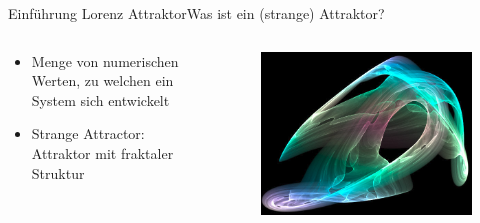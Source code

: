 \documentclass[presentation.tex]{subfiles}
\begin{document}
    \begin{frame}{Einführung Lorenz Attraktor}{Was ist ein (strange) Attraktor?}
		
		
		
		\begin{columns}[c]
			\begin{column}{.6\textwidth}
				\begin{itemize}
					\item Menge von numerischen Werten, zu welchen ein System sich entwickelt
					\item Strange Attractor: Attraktor mit fraktaler Struktur
				\end{itemize}
			\end{column}
			\begin{column}{.4\textwidth}
				\begin{figure}
					\centering
					\includegraphics[width=1\linewidth]{Attractor}
					\label{fig:Attractor}
				\end{figure}
			\end{column}
		\end{columns}
    \end{frame}
    
\end{document}
